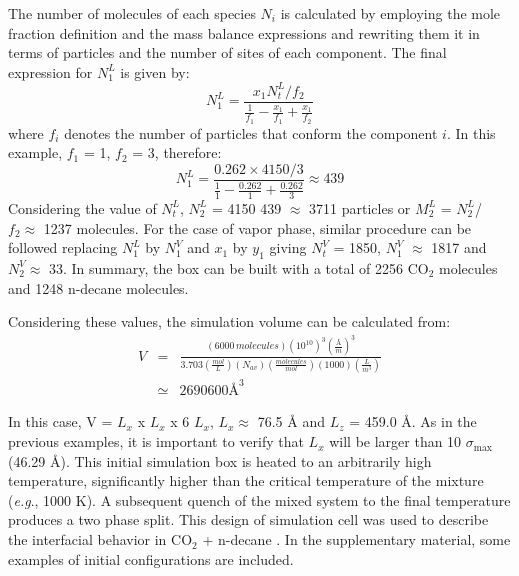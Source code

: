 \documentclass[9pt,tutorial]{livecoms}
\begin{document}
\begin{mdframed}[linewidth=0pt,backgroundcolor=LiveCoMSLightBlue!8,fontcolor=LiveCoMSDarkBlue!80!black]
The number of molecules of each species $N_{i}$ is calculated by
employing the mole fraction definition and the mass balance expressions and
rewriting them it in terms of particles and the number of sites of each
component. The final expression for $N_{1}^{L}$ is given by:
\begin{equation}
N_{1}^{L}=\frac{x_{1}N_{t}^{L}/f_{2}}{\frac{1}{f_{1}}-\frac{x_{1}}{f_{1}}+\frac{x_{1}}{f_{2}}}
\end{equation}
where $f_{i}$ denotes the number of particles that conform the
component $i$. In this example, $f_{1}$ = 1, $f_{2}$
= 3, therefore:
\begin{equation}
N_{1}^{L}=\frac{0.262\times4150/3}{\frac{1}{1}-\frac{0.262}{1}+\frac{0.262}{3}}\approx439
\end{equation}
Considering the value of $N_{t}^{L}$, $N_{2}^{L}$ = 4150
\textendash{} 439 ${\approx}$ 3711 particles or $M_{2}^{L}$
= $N_{2}^{L}$/$f_{2}{\approx}$ 1237 molecules. For the
case of vapor phase, similar procedure can be followed replacing
$N_{1}^{L}$ by $N_{1}^{V}$ and $x_{1}$ by
$y_{1}$ giving $N_{t}^{V}$ = 1850, $N_{1}^{V}$
${\approx}$ 1817 and $N_{2}^{V}{\approx}$ 33. In summary, the box
can be built with a total of 2256 CO$_{2}$ molecules and 1248 n-decane
molecules.

Considering these values, the simulation volume can be calculated from:
\begin{eqnarray}
  V & = & \frac{\left(6000\,molecules\right)\left(10^{10}\right)^{3}\left(\frac{\textrm{Å}}{m}\right)^{3}}{3.703\left(\frac{mol}{L}\right)\left(N_{av}\right)\left(\frac{molecules}{mol}\right)\left(1000\right)\left(\frac{L}{m^{3}}\right)}\nonumber\\
  & \simeq & 2690600\textrm{Å}^{3}
\end{eqnarray}

In this case, V = $L_{x}$ x $L_{x}$ x 6 $L_{x}$,
$L_{x}{\approx}$ 76.5 \AA{} and $L_{z}$ = 459.0 \AA{}. As
in the previous examples, it is important to verify that $L_{x}$ will
be larger than 10 ${\sigma}_{\mathrm{max}}$ (46.29 \AA{}). This initial
simulation box is heated to an arbitrarily high temperature, significantly
higher than the critical temperature of the mixture (\textit{e.g}., 1000 K).
A subsequent quench of the mixed system to the final temperature produces a two
phase split. This design of simulation cell was used to describe the
interfacial behavior in CO$_{2}$ + n-decane \citep{mejia2014a}. In the supplementary material, some
examples of initial configurations are included.
\end{mdframed}
\end{document}
